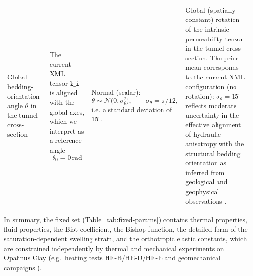 \documentclass[10pt,a4paper]{article}
\begin{document}
\begin{longtable}{P{3.0cm} P{3.0cm} P{4.7cm} P{6.3cm}}
Global bedding-orientation angle \(\theta\) in the tunnel cross-section &
The current XML tensor \(\texttt{k\_i}\) is aligned with the global axes,
which we interpret as a reference angle
\[
\theta_0 = 0~\text{rad}
\]
&
Normal (scalar):
\[
\theta \sim \mathcal{N}\bigl(0,\sigma_\theta^2\bigr),
\qquad
\sigma_\theta = \pi/12,
\]
i.e. a standard deviation of \(15^\circ\). &
Global (spatially constant) rotation of the intrinsic permeability tensor
in the tunnel cross-section.
The prior mean corresponds to the current XML configuration (no rotation);
\(\sigma_\theta = 15^\circ\) reflects moderate uncertainty in the effective
alignment of hydraulic anisotropy with the structural bedding orientation
as inferred from geological and geophysical observations
\cite[pp.~130--135]{Marschall2005}
\cite[pp.~2--5]{Garitte2017}
\cite[pp.~4447--4450]{WaterContentEDZ2024}.\\

\end{longtable}

In summary, the fixed set (Table~\ref{tab:fixed-params}) contains thermal properties,
fluid properties, the Biot coefficient, the Bishop function, the detailed form of the
saturation-dependent swelling strain, and the orthotropic elastic constants, which are
constrained independently by thermal and mechanical experiments on Opalinus Clay
(e.g.~heating tests HE-B/HE-D/HE-E and geomechanical campaigns
\cite[pp.~270--279]{Gens2017} \cite[pp.~153--166]{Amann2015}
\cite[pp.~211--222]{ThermalEffectsOPA2010}).
\end{document}
